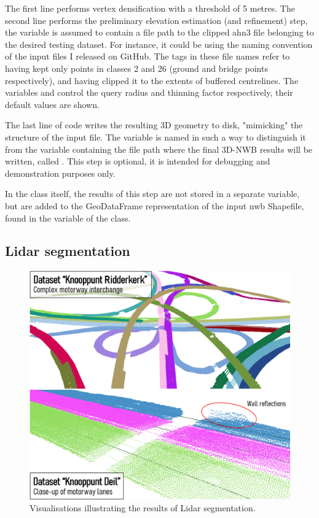 The first line performs vertex densification with a threshold of 5 metres. The second line performs the preliminary elevation estimation (and refinement) step, the variable  is assumed to contain a file path to the clipped \ac{ahn3} file belonging to the desired testing dataset. For instance, it could be  using the naming convention of the input files I released on GitHub. The tags  in these file names refer to having kept only points in classes 2 and 26 (ground and bridge points respectively), and having clipped it to the extents of buffered centrelines. The variables  and  control the query radius and thinning factor respectively, their default values are shown.

The last line of code writes the resulting 3D geometry to disk, "mimicking" the structure of the input file. The variable is named in such a way to distinguish it from the variable containing the file path where the final 3D-NWB results will be written, called . This step is optional, it is intended for debugging and demonstration purposes only.

In the class itself, the results of this step are not stored in a separate variable, but are added to the GeoDataFrame representation of the input \ac{nwb} Shapefile, found in the  variable of the  class.

\subsection{Lidar segmentation}
\label{sub:r_lidarsegmentation}

\begin{figure}
    \centering
    \includegraphics[width=0.86\linewidth]{final_report/figs/lidarsegmentation0.png}
    \caption{Visualisations illustrating the results of Lidar segmentation.}
    \label{fig:lidarsegmentation0}
\end{figure}


